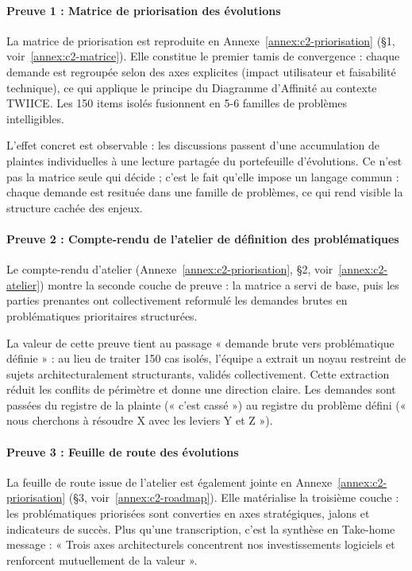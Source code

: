\paragraph{Preuve 1 : Matrice de priorisation des évolutions}

La matrice de priorisation est reproduite en Annexe~\ref{annex:c2-priorisation} (§1, voir~\ref{annex:c2-matrice}). Elle constitue le premier tamis de convergence : chaque demande est regroupée selon des axes explicites (impact utilisateur et faisabilité technique), ce qui applique le principe du Diagramme d'Affinité au contexte TWIICE. Les 150 items isolés fusionnent en 5-6 familles de problèmes intelligibles.

L'effet concret est observable : les discussions passent d'une accumulation de plaintes individuelles à une lecture partagée du portefeuille d'évolutions. Ce n'est pas la matrice seule qui décide ; c'est le fait qu'elle impose un langage commun : chaque demande est resituée dans une famille de problèmes, ce qui rend visible la structure cachée des enjeux.

\paragraph{Preuve 2 : Compte-rendu de l'atelier de définition des problématiques}

Le compte-rendu d'atelier (Annexe~\ref{annex:c2-priorisation}, §2, voir~\ref{annex:c2-atelier}) montre la seconde couche de preuve : la matrice a servi de base, puis les parties prenantes ont collectivement reformulé les demandes brutes en problématiques prioritaires structurées.

La valeur de cette preuve tient au passage « demande brute vers problématique définie » : au lieu de traiter 150 cas isolés, l'équipe a extrait un noyau restreint de sujets architecturalement structurants, validés collectivement. Cette extraction réduit les conflits de périmètre et donne une direction claire. Les demandes sont passées du registre de la plainte (« c'est cassé ») au registre du problème défini (« nous cherchons à résoudre X avec les leviers Y et Z »).

\paragraph{Preuve 3 : Feuille de route des évolutions}

La feuille de route issue de l'atelier est également jointe en Annexe~\ref{annex:c2-priorisation} (§3, voir~\ref{annex:c2-roadmap}). Elle matérialise la troisième couche : les problématiques priorisées sont converties en axes stratégiques, jalons et indicateurs de succès. Plus qu'une transcription, c'est la synthèse en Take-home message : « Trois axes architecturels concentrent nos investissements logiciels et renforcent mutuellement de la valeur ».

